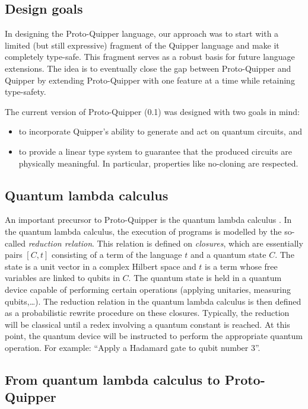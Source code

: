 \documentclass[twoside]{article}
\begin{document}
\subsection{Design goals}

In designing the Proto-Quipper language, our approach was to start
with a limited (but still expressive) fragment of the Quipper language
and make it completely type-safe.  This fragment serves as a robust
basis for future language extensions. The idea is to eventually close
the gap between Proto-Quipper and Quipper by extending Proto-Quipper
with one feature at a time while retaining type-safety. 

The current version of Proto-Quipper (0.1) was designed with two goals
in mind:
\begin{itemize}
  \item to incorporate Quipper's ability to generate and act on 
  quantum circuits, and 
\item to provide a linear type system to guarantee that the produced
  circuits are physically meaningful. In particular, properties like
  no-cloning are respected.
\end{itemize}

\subsection{Quantum lambda calculus}

An important precursor to Proto-Quipper is the quantum lambda calculus
{\cite{SeVa09}}. In the quantum lambda calculus, the execution of
programs is modelled by the so-called {\em reduction relation}. This
relation is defined on \emph{closures}, which are essentially pairs
$[C,t]$ consisting of a term of the language $t$ and a quantum state
$C$. The state is a unit vector in a complex Hilbert space and $t$ is
a term whose free variables are linked to qubits in $C$. The quantum
state is held in a quantum device capable of performing certain
operations (applying unitaries, measuring qubits,\ldots). The
reduction relation in the quantum lambda calculus is then defined as a
probabilistic rewrite procedure on these closures. Typically, the
reduction will be classical until a redex involving a quantum constant
is reached. At this point, the quantum device will be instructed to
perform the appropriate quantum operation. For example: ``Apply a
Hadamard gate to qubit number 3''.

\subsection{From quantum lambda calculus to Proto-Quipper}
\end{document}
